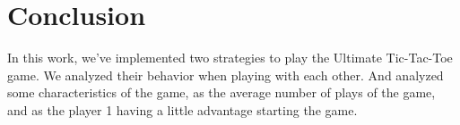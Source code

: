 \documentclass[10pt]{article}
\begin{document}
\section{Conclusion}
In this work, we've implemented two strategies to play the Ultimate Tic-Tac-Toe game. We analyzed their behavior when playing with each other. And analyzed some characteristics of the game, as the average number of plays of the game, and as the player 1 having a little advantage starting the game.


{}

\end{document}

